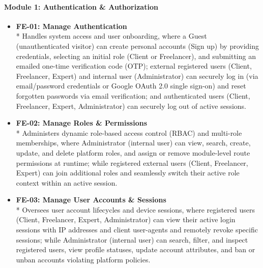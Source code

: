 \paragraph*{Module 1: Authentication \& Authorization}
\begin{itemize}[leftmargin=1.0cm, label=--]

\item \textbf{FE-01: Manage Authentication} \\*
Handles system access and user onboarding, where a Guest (unauthenticated visitor) can create personal accounts (Sign up) by providing credentials, selecting an initial role (Client or Freelancer), and submitting an emailed one-time verification code (OTP); external registered users (Client, Freelancer, Expert) and internal user (Administrator) can securely log in (via email/password credentials or Google OAuth 2.0 single sign-on) and reset forgotten passwords via email verification; and authenticated users (Client, Freelancer, Expert, Administrator) can securely log out of active sessions.

\item \textbf{FE-02: Manage Roles \& Permissions} \\*
Administers dynamic role-based access control (RBAC) and multi-role memberships, where Administrator (internal user) can view, search, create, update, and delete platform roles, and assign or remove module-level route permissions at runtime; while registered external users (Client, Freelancer, Expert) can join additional roles and seamlessly switch their active role context within an active session.

\item \textbf{FE-03: Manage User Accounts \& Sessions} \\*
Oversees user account lifecycles and device sessions, where registered users (Client, Freelancer, Expert, Administrator) can view their active login sessions with IP addresses and client user-agents and remotely revoke specific sessions; while Administrator (internal user) can search, filter, and inspect registered users, view profile statuses, update account attributes, and ban or unban accounts violating platform policies.

\end{itemize}

